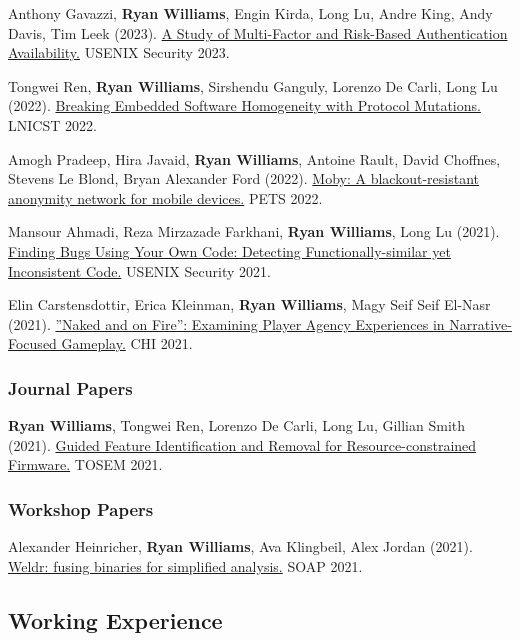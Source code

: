 \documentclass[11pt]{article}
\begin{document}
Anthony Gavazzi, \textbf{Ryan Williams}, Engin Kirda, Long Lu, Andre King, Andy Davis, Tim Leek (2023).
\href{https://www.usenix.org/system/files/sec23summer_41-gavazzi-prepub.pdf}{A Study of Multi-Factor and Risk-Based Authentication Availability.}
USENIX Security 2023.

Tongwei Ren, \textbf{Ryan Williams}, Sirshendu Ganguly, Lorenzo De Carli, Long Lu (2022).
\href{https://link.springer.com/chapter/10.1007/978-3-031-25538-0_40}{Breaking Embedded Software Homogeneity with Protocol Mutations.}
LNICST 2022.

Amogh Pradeep, Hira Javaid, \textbf{Ryan Williams}, Antoine Rault, David Choffnes, Stevens Le Blond, Bryan Alexander Ford (2022).
\href{https://infoscience.epfl.ch/record/301155}{Moby: A blackout-resistant anonymity network for mobile devices.}
PETS 2022.

Mansour Ahmadi, Reza Mirzazade Farkhani, \textbf{Ryan Williams}, Long Lu (2021).
\href{https://www.usenix.org/system/files/sec21-ahmadi.pdf}{Finding Bugs Using Your Own Code: Detecting Functionally-similar yet Inconsistent Code.}
USENIX Security 2021.

Elin Carstensdottir, Erica Kleinman, \textbf{Ryan Williams}, Magy Seif Seif El-Nasr (2021).
\href{https://dl.acm.org/doi/abs/10.1145/3411764.3445540}{”Naked and on Fire”: Examining Player Agency Experiences in Narrative-Focused Gameplay.}
CHI 2021.

\subsubsection{Journal Papers}
\textbf{Ryan Williams}, Tongwei Ren, Lorenzo De Carli, Long Lu, Gillian Smith (2021).
\href{https://dl.acm.org/doi/full/10.1145/3487568}{Guided Feature Identification and Removal for Resource-constrained Firmware.}
TOSEM 2021.

\subsubsection{Workshop Papers}
Alexander Heinricher, \textbf{Ryan Williams}, Ava Klingbeil, Alex Jordan (2021).
\href{https://dl.acm.org/doi/abs/10.1145/3460946.3464320}{Weldr: fusing binaries for simplified analysis.}
SOAP 2021.

\subsection{Working Experience}
\label{sec:working-experience}
\end{document}
